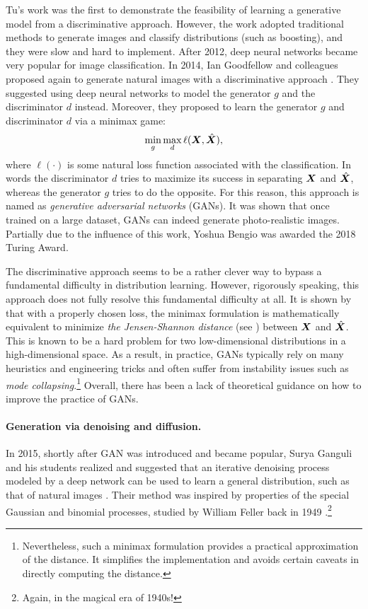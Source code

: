 \documentclass[../../book-main.tex]{subfiles}
\begin{document}
Tu's work \cite{Tu-2007} was the first to demonstrate the feasibility of learning a generative model from a discriminative approach. However, the work adopted traditional methods to generate images and classify distributions (such as boosting), and they were slow and hard to implement. After 2012, deep neural networks became very popular for image classification. In 2014, Ian Goodfellow and colleagues proposed again to generate natural images with a discriminative approach \cite{Goodfellow-2014}. They suggested using deep neural networks to model the generator $g$ and the discriminator $d$ instead. Moreover, they proposed to learn the generator $g$ and discriminator $d$ via a minimax game:
\begin{equation}
    \min_g \max_d \ell(\bm{X}, \hat {\bm{X}}),
\end{equation}
where $\ell(\cdot)$ is some natural loss function associated with the classification.  In words the discriminator $d$ tries to maximize its success in separating $\bm{X}$ and $\hat {\bm{X}}$, whereas the generator $g$ tries to do the opposite. For this reason, this approach is named as {\em generative adversarial networks} (GANs). It was shown that once trained on a large dataset, GANs can indeed generate photo-realistic images. Partially due to the influence of this work, Yoshua Bengio was awarded the 2018 Turing Award.

The discriminative approach seems to be a rather clever way to bypass a fundamental difficulty in distribution learning. However, rigorously speaking, this approach does not fully resolve this fundamental difficulty at all. It is shown by  \cite{Goodfellow-2014} that with a properly chosen loss, the minimax formulation is mathematically equivalent to minimize {\em the Jensen-Shannon distance} (see \cite{Cover-Thomas}) between $\bm{X}$ and $\hat {\bm{X}}$. This is known to be a hard problem for two low-dimensional distributions in a high-dimensional space. As a result, in practice, GANs typically rely on many heuristics and engineering tricks and often suffer from instability issues such as {\em mode collapsing}.\footnote{Nevertheless, such a minimax formulation provides a practical approximation of the distance. It simplifies the implementation and avoids certain caveats in directly computing the distance.} Overall, there has been a lack of theoretical guidance on how to improve the practice of GANs.

\paragraph{Generation via denoising and diffusion.}
In 2015, shortly after GAN was introduced and became popular, Surya Ganguli and his students realized and suggested that an iterative denoising process modeled by a deep network can be used to learn a general distribution, such as that of natural images \cite{Sohl-Dickstein2015}. Their method was inspired by properties of the special Gaussian and binomial processes, studied by William Feller back in 1949 \cite{Feller1949OnTT}.\footnote{Again, in the magical era of 1940s!} 
\end{document}
